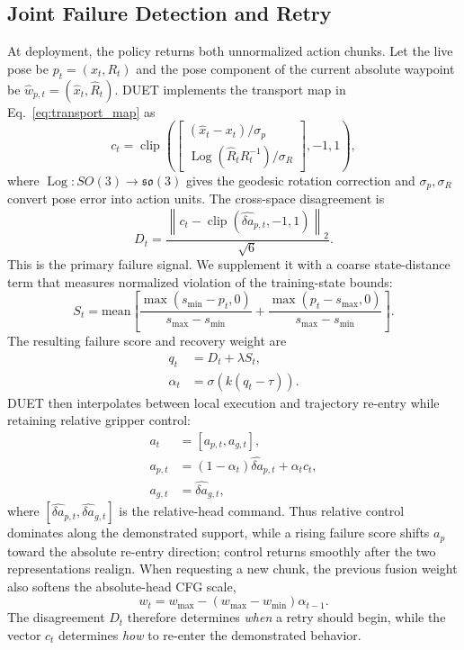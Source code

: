 \documentclass[letterpaper, 10 pt, conference]{ieeeconf}
\begin{document}
\subsection{Joint Failure Detection and Retry}
At deployment, the policy returns both unnormalized action chunks. Let the live pose be $p_t=(x_t,R_t)$ and the pose component of the current absolute waypoint be $\hat{w}_{p,t}=(\hat{x}_t,\hat{R}_t)$. DUET implements the transport map in Eq.~\eqref{eq:transport_map} as
\begin{equation}
    c_t=\operatorname{clip}\!\left(
    \begin{bmatrix}
    (\hat{x}_t-x_t)/\sigma_p \\
    \operatorname{Log}(\hat{R}_tR_t^{-1})/\sigma_R
    \end{bmatrix},-1,1\right),
    \label{eq:recovery_vector}
\end{equation}
where $\operatorname{Log}:SO(3)\rightarrow\mathfrak{so}(3)$ gives the geodesic rotation correction and $\sigma_p,\sigma_R$ convert pose error into action units. The cross-space disagreement is
\begin{equation}
    D_t=\frac{\left\|c_t-
    \operatorname{clip}(\hat{\delta a}_{p,t},-1,1)\right\|_2}{\sqrt{6}}.
    \label{eq:disagreement}
\end{equation}
This is the primary failure signal. We supplement it with a coarse state-distance term that measures normalized violation of the training-state bounds:
\begin{equation}
    S_t =
    \mathrm{mean}\left[
    \frac{\max(s_{\min} - p_t, 0)}{s_{\max}-s_{\min}}
    +
    \frac{\max(p_t - s_{\max}, 0)}{s_{\max}-s_{\min}}
    \right].
\end{equation}
The resulting failure score and recovery weight are
\begin{align}
    q_t &= D_t + \lambda S_t, \\
    \alpha_t &= \sigma(k(q_t-\tau)).
\end{align}
DUET then interpolates between local execution and trajectory re-entry while retaining relative gripper control:
\begin{align}
    a_t &= [a_{p,t},a_{g,t}], \\
    a_{p,t} &= (1-\alpha_t)\hat{\delta a}_{p,t} + \alpha_t c_t, \\
    a_{g,t} &= \hat{\delta a}_{g,t},
    \label{eq:fused_action}
\end{align}
where $[\hat{\delta a}_{p,t},\hat{\delta a}_{g,t}]$ is the relative-head command. Thus relative control dominates along the demonstrated support, while a rising failure score shifts $a_p$ toward the absolute re-entry direction; control returns smoothly after the two representations realign. When requesting a new chunk, the previous fusion weight also softens the absolute-head CFG scale,
\begin{equation}
    w_t = w_{\max} - (w_{\max}-w_{\min})\alpha_{t-1}.
\end{equation}
The disagreement $D_t$ therefore determines \emph{when} a retry should begin, while the vector $c_t$ determines \emph{how} to re-enter the demonstrated behavior.
\end{document}

